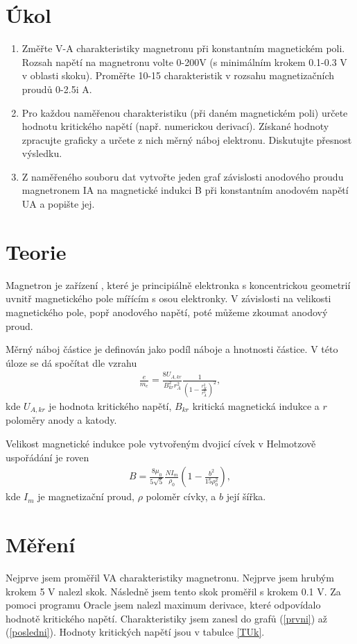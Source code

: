 \documentclass[a4paper,12pt]{article}
\begin{document}
\section{Úkol}
\begin{enumerate}
    \item Změřte V-A charakteristiky magnetronu při konstantním magnetickém poli. Rozsah napětí na magnetronu volte 0-200V (s minimálním krokem 0.1-0.3 V v oblasti skoku). Proměřte 10-15 charakteristik v rozsahu magnetizačních proudů 0-2.5i A.
    \item Pro každou naměřenou charakteristiku (při daném magnetickém poli) určete hodnotu kritického napětí (např. numerickou derivací). Získané hodnoty zpracujte graficky a určete z nich měrný náboj elektronu. Diskutujte přesnost výsledku. 
    \item Z naměřeného souboru dat vytvořte jeden graf závislosti anodového proudu magnetronem IA na magnetické indukci B při konstantním anodovém napětí UA a popište jej.
\end{enumerate}

\section{Teorie}
Magnetron je zařízení , které je principiálně elektronka s koncentrickou geometrií uvnitř magnetického pole mířícím s osou elektronky. V závislosti na velikosti magnetického pole, popř anodového napětí, poté můžeme zkoumat anodový proud. 

Měrný náboj částice je definován jako podíl náboje a hnotnosti částice. V této úloze se dá spočítat dle vzrahu
\begin{eqnarray}
\frac{e}{m_e}=\frac{8U_{A,kr}}{B^2_{kr}r_A^2}\frac{1}{\left(1-\frac{r^2_K}{r^2_A}\right)^2},
\label{w}
\end{eqnarray}
kde $U_{A,kr}$ je hodnota kritického napětí, $B_{kr}$ kritická magnetická indukce a $r$ poloměry anody a katody.

Velikost magnetické indukce pole vytvořeným dvojicí cívek v Helmotzově uspořádání je roven
\begin{eqnarray}
B=\frac{8\mu_0}{5\sqrt{5}}\frac{NI_{m}}{\rho_0}\left(1-\frac{b^2}{15\rho_0^2}\right),
\end{eqnarray}
kde $I_m$ je magnetizační proud, $\rho$ poloměr cívky, a $b$ její šířka. 


\section{Měření}
Nejprve jsem proměřil VA charakteristiky magnetronu. Nejprve jsem hrubým krokem 5 V nalezl skok. Následně jsem tento skok proměřil s krokem 0.1 V. Za pomoci programu Oracle jsem nalezl maximum derivace, které odpovídalo hodnotě kritického napětí. Charakteristiky jsem zanesl do grafů (\ref{prvni}) až (\ref{posledni}). 
Hodnoty kritických napětí jsou v tabulce \ref{TUk}.
\end{document}
